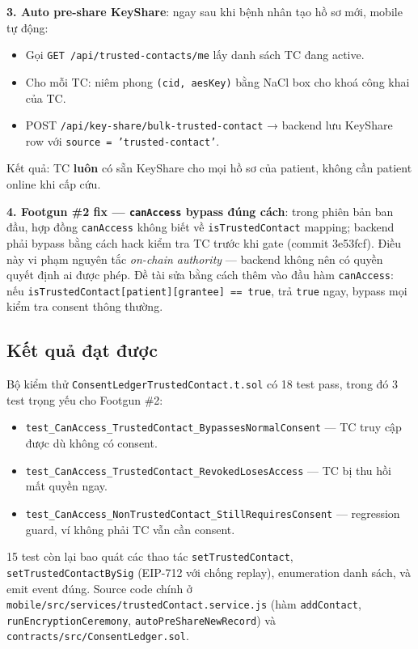\documentclass[../DoAn]{subfiles}
\begin{document}
\begin{itemize}
\textbf{3. Auto pre-share KeyShare}: ngay sau khi bệnh nhân tạo hồ sơ mới, mobile tự động:

\begin{itemize}
    \item Gọi \texttt{GET /api/trusted-contacts/me} lấy danh sách TC đang active.
    \item Cho mỗi TC: niêm phong \texttt{(cid, aesKey)} bằng NaCl box cho khoá công khai của TC.
    \item POST \texttt{/api/key-share/bulk-trusted-contact} → backend lưu KeyShare row với \texttt{source = 'trusted-contact'}.
\end{itemize}

Kết quả: TC \textbf{luôn} có sẵn KeyShare cho mọi hồ sơ của patient, không cần patient online khi cấp cứu.

\textbf{4. Footgun \#2 fix --- \texttt{canAccess} bypass đúng cách}: trong phiên bản ban đầu, hợp đồng \texttt{canAccess} không biết về \texttt{isTrustedContact} mapping; backend phải bypass bằng cách hack kiểm tra TC trước khi gate (commit 3e53fcf). Điều này vi phạm nguyên tắc \textit{on-chain authority} --- backend không nên có quyền quyết định ai được phép. Đề tài sửa bằng cách thêm vào đầu hàm \texttt{canAccess}: nếu \texttt{isTrustedContact[patient][grantee] == true}, trả \texttt{true} ngay, bypass mọi kiểm tra consent thông thường.

\subsection{Kết quả đạt được}

Bộ kiểm thử \texttt{ConsentLedgerTrustedContact.t.sol} có 18 test pass, trong đó 3 test trọng yếu cho Footgun \#2:

\begin{itemize}
    \item \texttt{test\_CanAccess\_TrustedContact\_BypassesNormalConsent} --- TC truy cập được dù không có consent.
    \item \texttt{test\_CanAccess\_TrustedContact\_RevokedLosesAccess} --- TC bị thu hồi mất quyền ngay.
    \item \texttt{test\_CanAccess\_NonTrustedContact\_StillRequiresConsent} --- regression guard, ví không phải TC vẫn cần consent.
\end{itemize}

15 test còn lại bao quát các thao tác \texttt{setTrustedContact}, \texttt{setTrustedContactBySig} (EIP-712 với chống replay), enumeration danh sách, và emit event đúng. Source code chính ở \texttt{mobile/src/services/trustedContact.service.js} (hàm \texttt{addContact}, \texttt{runEncryptionCeremony}, \texttt{autoPreShareNewRecord}) và \texttt{contracts/src/ConsentLedger.sol}.


\end{itemize}
\end{document}
